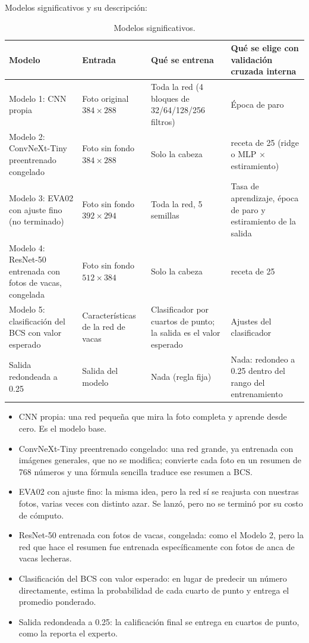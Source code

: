Modelos significativos y su descripción:

\begin{table}[H]
  \centering
  \small
  \caption{Modelos significativos.}
  \label{tab:modelos}
  \begin{tabularx}{\textwidth}{>{\raggedright\arraybackslash}p{}>{\raggedright\arraybackslash}p{}>{\raggedright\arraybackslash}X>{\raggedright\arraybackslash}X}
    \toprule
    Modelo & Entrada & Qué se entrena & Qué se elige con validación cruzada interna \\
    \midrule
    Modelo 1: CNN propia & Foto original $384\times288$ & Toda la red (4 bloques de 32/64/128/256 filtros) & Época de paro \\
    \addlinespace
    Modelo 2: ConvNeXt-Tiny preentrenado congelado & Foto sin fondo $384\times288$ & Solo la cabeza & 1 receta de 25 (ridge o MLP $\times$ estiramiento) \\
    \addlinespace
    Modelo 3: EVA02 con ajuste fino (no terminado) & Foto sin fondo $392\times294$ & Toda la red, 5 semillas & Tasa de aprendizaje, época de paro y estiramiento de la salida \\
    \addlinespace
    Modelo 4: ResNet-50 entrenada con fotos de vacas, congelada & Foto sin fondo $512\times384$ & Solo la cabeza & 1 receta de 25 \\
    \addlinespace
    Modelo 5: clasificación del BCS con valor esperado & Características de la red de vacas & Clasificador por cuartos de punto; la salida es el valor esperado & Ajustes del clasificador \\
    \addlinespace
    Salida redondeada a 0.25 & Salida del modelo & Nada (regla fija) & Nada: redondeo a 0.25 dentro del rango del entrenamiento \\
    \bottomrule
  \end{tabularx}
\end{table}

\begin{itemize}
  \item CNN propia: una red pequeña que mira la foto completa y aprende desde cero. Es el modelo base.
  \item ConvNeXt-Tiny preentrenado congelado: una red grande, ya entrenada con imágenes generales, que no se modifica; convierte cada foto en un resumen de 768 números y una fórmula sencilla traduce ese resumen a BCS.
  \item EVA02 con ajuste fino: la misma idea, pero la red sí se reajusta con nuestras fotos, varias veces con distinto azar. Se lanzó, pero no se terminó por su costo de cómputo.
  \item ResNet-50 entrenada con fotos de vacas, congelada: como el Modelo 2, pero la red que hace el resumen fue entrenada específicamente con fotos de anca de vacas lecheras.
  \item Clasificación del BCS con valor esperado: en lugar de predecir un número directamente, estima la probabilidad de cada cuarto de punto y entrega el promedio ponderado.
  \item Salida redondeada a 0.25: la calificación final se entrega en cuartos de punto, como la reporta el experto.
\end{itemize}
